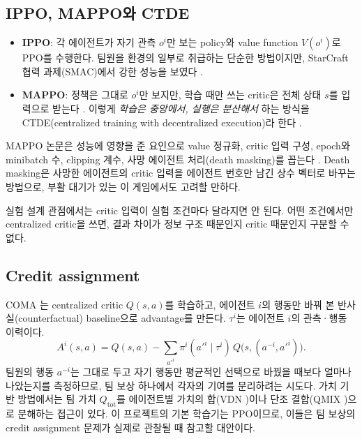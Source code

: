 \documentclass[11pt,a4paper]{article}
\begin{document}
\subsection{IPPO, MAPPO와 CTDE}
\begin{itemize}
 \item \textbf{IPPO}: 각 에이전트가 자기 관측 \(o^i\)만 보는 policy와 value function \(V(o^i)\)로 PPO를 수행한다. 팀원을 환경의 일부로 취급하는 단순한 방법이지만, StarCraft 협력 과제(SMAC)에서 강한 성능을 보였다 \cite{ippo}.
 \item \textbf{MAPPO}: 정책은 그대로 \(o^i\)만 보지만, 학습 때만 쓰는 critic은 전체 상태 \(s\)를 입력으로 받는다 \cite{mappo}. 이렇게 \emph{학습은 중앙에서, 실행은 분산해서} 하는 방식을 CTDE(centralized training with decentralized execution)라 한다 \cite{maddpg}.
\end{itemize}
MAPPO 논문은 성능에 영향을 준 요인으로 value 정규화, critic 입력 구성, epoch와 minibatch 수, clipping 계수, 사망 에이전트 처리(death masking)를 꼽는다 \cite{mappo}. Death masking은 사망한 에이전트의 critic 입력을 에이전트 번호만 남긴 상수 벡터로 바꾸는 방법으로, 부활 대기가 있는 이 게임에서도 고려할 만하다.

실험 설계 관점에서는 critic 입력이 실험 조건마다 달라지면 안 된다. 어떤 조건에서만 centralized critic을 쓰면, 결과 차이가 정보 구조 때문인지 critic 때문인지 구분할 수 없다.

\subsection{Credit assignment}
COMA \cite{coma}는 centralized critic \(Q(s,a)\)를 학습하고, 에이전트 \(i\)의 행동만 바꿔 본 반사실(counterfactual) baseline으로 advantage를 만든다. \(\tau^i\)는 에이전트 \(i\)의 관측·행동 이력이다.
\begin{equation}
 A^i(s,a)=Q(s,a)-\sum_{a'^i}\pi^i(a'^i\mid\tau^i)\,Q\bigl(s,(a^{-i},a'^i)\bigr).
\end{equation}
팀원의 행동 \(a^{-i}\)는 그대로 두고 자기 행동만 평균적인 선택으로 바꿨을 때보다 얼마나 나았는지를 측정하므로, 팀 보상 하나에서 각자의 기여를 분리하려는 시도다. 가치 기반 방법에서는 팀 가치 \(Q_{\mathrm{tot}}\)를 에이전트별 가치의 합(VDN \cite{vdn})이나 단조 결합(QMIX \cite{qmix})으로 분해하는 접근이 있다. 이 프로젝트의 기본 학습기는 PPO이므로, 이들은 팀 보상의 credit assignment 문제가 실제로 관찰될 때 참고할 대안이다.
\end{document}
